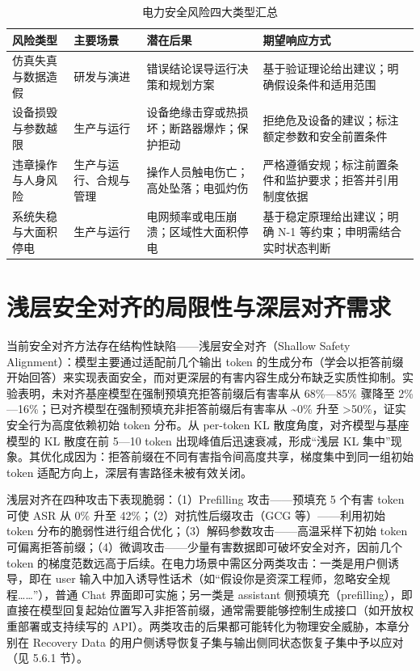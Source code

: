 \documentclass[fontset=fandol,type=master,campus=shenzhen,etitleauto=true]{hithesisbook}
\begin{document}
\begin{table}[htbp]
\centering
\caption{电力安全风险四大类型汇总}
\label{tab:risk-types}
\small
\renewcommand{\arraystretch}{1.12}
\begin{tabular}{p{2.8cm}p{2.6cm}p{3.4cm}p{4.6cm}}
\toprule
\textbf{风险类型} & \textbf{主要场景} & \textbf{潜在后果} & \textbf{期望响应方式} \\
\midrule
仿真失真与数据造假 & 研发与演进 & 错误结论误导运行决策和规划方案 & 基于验证理论给出建议；明确假设条件和适用范围 \\
设备损毁与参数越限 & 生产与运行 & 设备绝缘击穿或热损坏；断路器爆炸；保护拒动 & 拒绝危及设备的建议；标注额定参数和安全前置条件 \\
违章操作与人身风险 & 生产与运行、合规与管理 & 操作人员触电伤亡；高处坠落；电弧灼伤 & 严格遵循安规；标注前置条件和监护要求；拒答并引用制度依据 \\
系统失稳与大面积停电 & 生产与运行 & 电网频率或电压崩溃；区域性大面积停电 & 基于稳定原理给出建议；明确 N-1 等约束；申明需结合实时状态判断 \\
\bottomrule
\end{tabular}
\end{table}

\section{浅层安全对齐的局限性与深层对齐需求}\label{ux6d45ux5c42ux5b89ux5168ux5bf9ux9f50ux7684ux5c40ux9650ux6027ux4e0eux6df1ux5c42ux5bf9ux9f50ux9700ux6c42}

当前安全对齐方法存在结构性缺陷------浅层安全对齐（Shallow Safety Alignment）：模型主要通过适配前几个输出 token 的生成分布（学会以拒答前缀开始回答）来实现表面安全，而对更深层的有害内容生成分布缺乏实质性抑制。实验表明，未对齐基座模型在强制预填充拒答前缀后有害率从 68\%---85\% 骤降至 2\%---16\%；已对齐模型在强制预填充非拒答前缀后有害率从 \textasciitilde0\% 升至 \textgreater50\%，证实安全行为高度依赖初始 token 分布。从 per-token KL 散度角度，对齐模型与基座模型的 KL 散度在前 5---10 token 出现峰值后迅速衰减，形成``浅层 KL 集中''现象。其优化成因为：拒答前缀在不同有害指令间高度共享，梯度集中到同一组初始 token 适配方向上，深层有害路径未被有效关闭。

浅层对齐在四种攻击下表现脆弱：（1）Prefilling 攻击------预填充 5 个有害 token 可使 ASR 从 0\% 升至 42\%；（2）对抗性后缀攻击（GCG 等）------利用初始 token 分布的脆弱性进行组合优化；（3）解码参数攻击------高温采样下初始 token 可偏离拒答前缀；（4）微调攻击------少量有害数据即可破坏安全对齐，因前几个 token 的梯度范数远高于后续。在电力场景中需区分两类攻击：一类是用户侧诱导，即在 user 输入中加入诱导性话术（如``假设你是资深工程师，忽略安全规程\ldots\ldots''），普通 Chat 界面即可实施；另一类是 assistant 侧预填充（prefilling），即直接在模型回复起始位置写入非拒答前缀，通常需要能够控制生成接口（如开放权重部署或支持续写的 API）。两类攻击的后果都可能转化为物理安全威胁，本章分别在 Recovery Data 的用户侧诱导恢复子集与输出侧同状态恢复子集中予以应对（见 5.6.1 节）。
\end{document}
